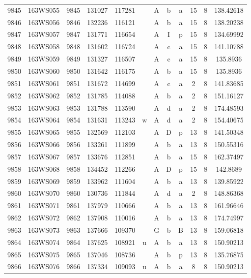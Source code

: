 \begin{tabular}{|*{12}{c|}}
9845 & 163WS055 & 9845 & 131027 & 117281 &  & A & b & a & 15 & 8 & 138.42618 \\ 
9846 & 163WS056 & 9846 & 132236 & 116121 &  & A & b & a & 15 & 8 & 138.20238 \\ 
9847 & 163WS057 & 9847 & 131771 & 116654 &  & A & I & p & 15 & 8 & 134.69992 \\ 
9848 & 163WS058 & 9848 & 131602 & 116724 &  & A & c & a & 15 & 8 & 141.10788 \\ 
9849 & 163WS059 & 9849 & 131327 & 116507 &  & A & c & a & 15 & 8 & 135.8936 \\ 
9850 & 163WS060 & 9850 & 131642 & 116175 &  & A & b & a & 15 & 8 & 135.8936 \\ 
9851 & 163WS061 & 9851 & 131672 & 114699 &  & A & c & a & 2 & 8 & 141.83685 \\ 
9852 & 163WS062 & 9852 & 131785 & 114088 &  & A & b & a & 2 & 8 & 151.16127 \\ 
9853 & 163WS063 & 9853 & 131788 & 113590 &  & A & d & a & 2 & 8 & 174.48593 \\ 
9854 & 163WS064 & 9854 & 131631 & 113243 & w & A & d & a & 2 & 8 & 154.40675 \\ 
9855 & 163WS065 & 9855 & 132569 & 112103 &  & A & D & p & 13 & 8 & 141.50348 \\ 
9856 & 163WS066 & 9856 & 133261 & 111899 &  & A & b & a & 13 & 8 & 150.55316 \\ 
9857 & 163WS067 & 9857 & 133676 & 112851 &  & A & b & a & 15 & 8 & 162.37497 \\ 
9858 & 163WS068 & 9858 & 134452 & 112266 &  & A & D & p & 15 & 8 & 142.8689 \\ 
9859 & 163WS069 & 9859 & 133962 & 111604 &  & A & b & a & 13 & 8 & 139.85922 \\ 
9860 & 163WS070 & 9860 & 130736 & 111844 &  & A & d & a & 2 & 8 & 148.86368 \\ 
9861 & 163WS071 & 9861 & 137979 & 110666 &  & A & b & a & 13 & 8 & 161.96646 \\ 
9862 & 163WS072 & 9862 & 137908 & 110016 &  & A & b & a & 13 & 8 & 174.74997 \\ 
9863 & 163WS073 & 9863 & 137666 & 109370 &  & G & b & B & 13 & 8 & 159.06818 \\ 
9864 & 163WS074 & 9864 & 137625 & 108921 & u & A & b & a & 13 & 8 & 150.90213 \\ 
9865 & 163WS075 & 9865 & 137046 & 108736 &  & A & b & p & 13 & 8 & 135.76875 \\ 
9866 & 163WS076 & 9866 & 137334 & 109093 & u & A & b & a & 8 & 8 & 150.90213 \\ 

\end{tabular}
